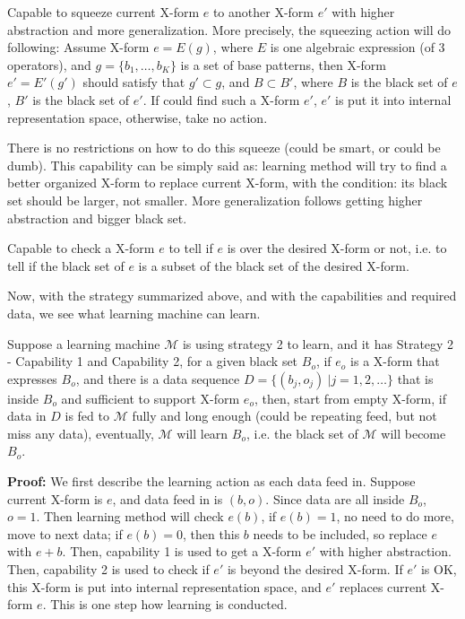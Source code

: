 \begin{definition}
Capable to squeeze current X-form $e$ to another X-form $e'$ with higher abstraction and more generalization. More precisely, the squeezing action will do following: Assume X-form $e = E(g)$, where $E$ is one algebraic expression (of 3 operators), and $g = \{b_1, \ldots, b_K\}$ is a set of base patterns, then X-form $e' = E'(g')$ should satisfy that $g' \subset g$, and $B \subset B'$, where $B$ is the black set of $e$, $B'$ is the black set of $e'$. If could find such a X-form $e'$, $e'$ is put it into internal representation space, otherwise, take no action.  
\end{definition}
There is no restrictions on how to do this squeeze (could be smart, or could be dumb). This capability can be simply said as: learning method will try to find a better organized X-form to replace current X-form, with the condition: its black set should be larger, not smaller. More generalization follows getting higher abstraction and bigger black set.



\begin{definition}
Capable to check a X-form $e$ to tell if $e$ is over the desired X-form or not, i.e. to tell if the black set of $e$ is a subset of the black set of the desired X-form.  
\end{definition}


Now, with the strategy summarized above, and with the capabilities and required data, we see what learning machine can learn. 


\begin{theorem}
Suppose a learning machine $\mathcal{M}$ is using strategy 2 to learn, and it has Strategy 2 - Capability 1 and Capability 2, for a given black set $B_o$, if $e_o$ is a X-form that expresses $B_o$, and there is a data sequence $D = \{ (b_j, o_j) \ | j = 1, 2, \ldots \}$ that is inside $B_o$ and sufficient to support X-form $e_o$, then, start from empty X-form, if data in $D$ is fed to $\mathcal{M}$ fully and long enough (could be repeating feed, but not miss any data), eventually, $\mathcal{M}$ will learn $B_o$, i.e. the black set of $\mathcal{M}$ will become $B_o$.        
\end{theorem}
{\bf Proof:} We first describe the learning action as each data feed in. Suppose current X-form is $e$, and data feed in is $(b, o)$. Since data are all inside $B_o$, $o = 1$. Then learning method will check $e(b)$, if $e(b) = 1$, no need to do more, move to next data; if $e(b) = 0$, then this $b$ needs to be included, so replace $e$ with $e + b$. Then, capability 1 is used to get a X-form $e'$ with higher abstraction. Then, capability 2 is used to check if $e'$ is beyond the desired X-form. If $e'$ is OK, this X-form is put into internal representation space, and $e'$ replaces current X-form $e$. This is one step how learning is conducted.

